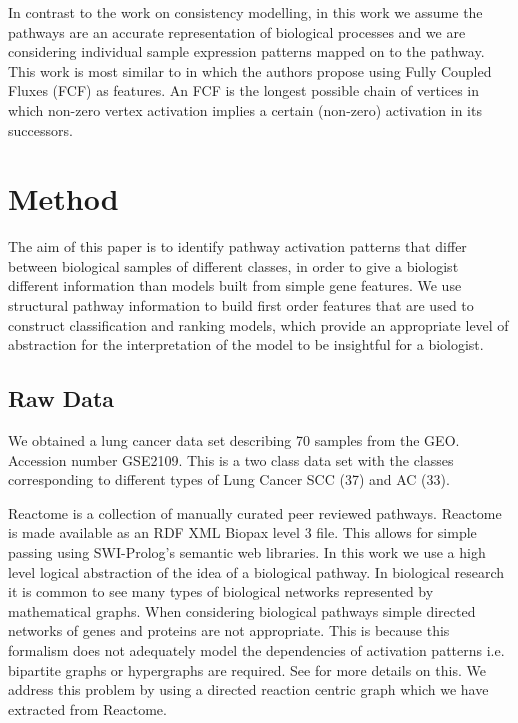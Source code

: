 \documentclass[runningheads,a4paper]{llncs}
\begin{document}
In contrast to the work on consistency modelling, in this work we assume the pathways are an accurate representation of biological processes and we are considering individual sample expression patterns mapped on to the pathway. This work is most similar to  \citep{holec2008using} in which the authors propose using Fully Coupled Fluxes (FCF) as features. An FCF is the longest possible chain of vertices in which non-zero vertex activation implies a certain (non-zero) activation in its successors.

%

	  
\section{Method}
The aim of this paper is to identify pathway activation patterns that differ between biological samples of different classes, in order to give a biologist different information than models built from simple gene features. We use structural pathway information to build first order features that are used to construct classification and ranking models, which  provide an appropriate level of abstraction for the interpretation of the model to be insightful for a biologist. 
\subsection{Raw Data} 
We obtained a lung cancer data set describing 70 samples from the GEO. Accession number GSE2109. This is a two class data set with the classes corresponding to different types of Lung Cancer SCC (37) and AC (33). 
	
Reactome \citep{croft_reactome_2013} is a collection of manually curated peer reviewed pathways. Reactome is made available as an RDF XML Biopax level 3 file. This allows for simple passing using SWI-Prolog's semantic web libraries. 
In this work we use a high level logical abstraction of the idea of a biological pathway. In biological research it is common to see many types of biological networks represented by mathematical graphs. When considering biological pathways simple directed networks of genes and proteins are not appropriate. This is because this formalism does not adequately model the dependencies of activation patterns i.e. bipartite graphs or hypergraphs are required. See \citep{whelan2011representation} for more details on this. We address this problem by using a directed reaction centric graph which we have extracted from Reactome.
\end{document}
